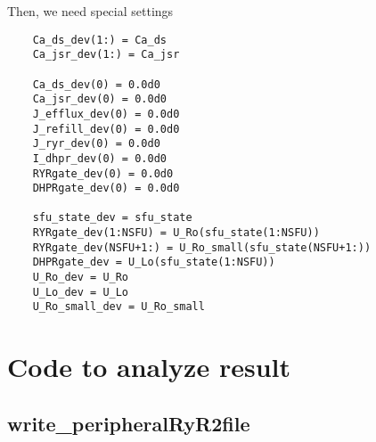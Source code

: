 Then, we need special settings
% 
\begin{verbatim}
    Ca_ds_dev(1:) = Ca_ds
    Ca_jsr_dev(1:) = Ca_jsr

    Ca_ds_dev(0) = 0.0d0
    Ca_jsr_dev(0) = 0.0d0
    J_efflux_dev(0) = 0.0d0
    J_refill_dev(0) = 0.0d0
    J_ryr_dev(0) = 0.0d0
    I_dhpr_dev(0) = 0.0d0
    RYRgate_dev(0) = 0.0d0
    DHPRgate_dev(0) = 0.0d0

    sfu_state_dev = sfu_state
    RYRgate_dev(1:NSFU) = U_Ro(sfu_state(1:NSFU))
    RYRgate_dev(NSFU+1:) = U_Ro_small(sfu_state(NSFU+1:))
    DHPRgate_dev = U_Lo(sfu_state(1:NSFU))
    U_Ro_dev = U_Ro
    U_Lo_dev = U_Lo
    U_Ro_small_dev = U_Ro_small

\end{verbatim}


%        
%        

\section{Code to analyze result}

\subsection{write\_peripheralRyR2file}

